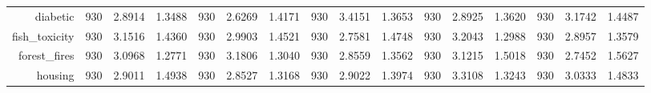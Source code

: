 \begin{table}[htbp]
{\begin{tabular}{rccccccccccccccc}
			diabetic                            & 930                                 & 2.8914                                                                    & 1.3488          & 930                                & \cellcolor[rgb]{ .776,  .937,  .808}\textcolor[rgb]{ 0,  .38,  0}{2.6269}          & 1.4171          & 930                                & 3.4151                                                                    & 1.3653          & 930                                & 2.8925                                                                    & 1.3620          & 930                                    & 3.1742                                                                    & 1.4487          \\
			fish\_toxicity                      & 930                                 & 3.1516                                                                    & 1.4360          & 930                                & 2.9903                                                                             & 1.4521          & 930                                & \cellcolor[rgb]{ .776,  .937,  .808}\textcolor[rgb]{ 0,  .38,  0}{2.7581} & 1.4748          & 930                                & 3.2043                                                                    & 1.2988          & 930                                    & 2.8957                                                                    & 1.3579          \\
			forest\_fires                       & 930                                 & 3.0968                                                                    & 1.2771          & 930                                & 3.1806                                                                             & 1.3040          & 930                                & 2.8559                                                                    & 1.3562          & 930                                & 3.1215                                                                    & 1.5018          & 930                                    & \cellcolor[rgb]{ .776,  .937,  .808}\textcolor[rgb]{ 0,  .38,  0}{2.7452} & 1.5627          \\
			housing                             & 930                                 & 2.9011                                                                    & 1.4938          & 930                                & \cellcolor[rgb]{ .776,  .937,  .808}\textcolor[rgb]{ 0,  .38,  0}{2.8527}          & 1.3168          & 930                                & 2.9022                                                                    & 1.3974          & 930                                & 3.3108                                                                    & 1.3243          & 930                                    & 3.0333                                                                    & 1.4833          \\

\end{tabular}}
\end{table}
